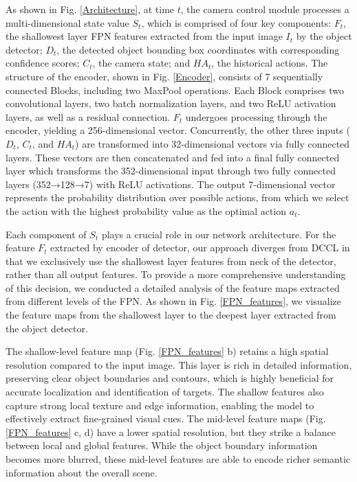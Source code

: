\documentclass[lettersize,journal]{IEEEtran}
\begin{document}
As shown in Fig. \ref{Architecture}, at time $t$, the camera control module processes a multi-dimensional state value $S_t$, which is comprised of four key components: $F_t$, the shallowest layer FPN features extracted from the input image $I_t$ by the object detector; $D_t$, the detected object bounding box coordinates with corresponding confidence scores; $C_t$, the camera state; and ${HA}_t$, the historical actions.
The structure of the encoder, shown in Fig. \ref{Encoder}, consists of 7 sequentially connected Blocks, including two MaxPool operations. Each Block comprises two convolutional layers, two batch normalization layers, and two ReLU activation layers, as well as a residual connection. $F_t$ undergoes processing through the encoder, yielding a 256-dimensional vector.
Concurrently, the other three inputs ($D_t$, $C_t$, and ${HA}_t$) are transformed into 32-dimensional vectors via fully connected layers. These vectors are then concatenated and fed into a final fully connected layer which transforms the 352-dimensional input through two fully connected layers (352→128→7) with ReLU activations. The output 7-dimensional vector represents the probability distribution over possible actions, from which we select the action with the highest probability value as the optimal action $a_t$.

Each component of $S_t$ plays a crucial role in our network architecture. For the feature $F_t$ extracted by encoder of detector, our approach diverges from DCCL in that we exclusively use the shallowest layer features from neck of the detector, rather than all output features.
To provide a more comprehensive understanding of this decision, we conducted a detailed analysis of the feature maps extracted from different levels of the FPN. As shown in Fig. \ref{FPN_features}, we visualize the feature maps from the shallowest layer to the deepest layer extracted from the object detector.


The shallow-level feature map (Fig. \ref{FPN_features} b) retains a high spatial resolution compared to the input image. This layer is rich in detailed information, preserving clear object boundaries and contours, which is highly beneficial for accurate localization and identification of targets. The shallow features also capture strong local texture and edge information, enabling the model to effectively extract fine-grained visual cues.
The mid-level feature maps (Fig. \ref{FPN_features} c, d) have a lower spatial resolution, but they strike a balance between local and global features. While the object boundary information becomes more blurred, these mid-level features are able to encode richer semantic information about the overall scene.
\end{document}
